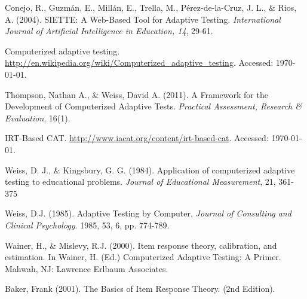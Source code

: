 \begin{thebibliography}{9}

 Conejo, R., Guzmán, E., Millán, E., Trella, M., Pérez-de-la-Cruz, J. L., \& Rios, A. (2004). SIETTE: A Web-Based Tool for Adaptive Testing. \textit{International Journal of Artificial Intelligence in Education, 14}, 29-61.

 Computerized adaptive testing. \url{http://en.wikipedia.org/wiki/Computerized_adaptive_testing}. Accessed: \today.

 Thompson, Nathan A., \& Weiss, David A. (2011). A Framework for the Development of Computerized Adaptive Tests. \textit{Practical Assessment, Research \& Evaluation}, 16(1).

 IRT-Based CAT. \url{http://www.iacat.org/content/irt-based-cat}. Accessed: \today.

 Weiss, D. J., \& Kingsbury, G. G. (1984). Application of computerized adaptive testing to educational problems. \textit{Journal of Educational Measurement}, 21, 361-375

 Weiss, D.J. (1985). Adaptive Testing by Computer, \textit{Journal of Consulting and Clinical Psychology}. 1985, 53, 6, pp. 774-789.

 Wainer, H., \& Mislevy, R.J. (2000). Item response theory, calibration, and estimation. In Wainer, H. (Ed.) Computerized Adaptive Testing: A Primer. Mahwah, NJ: Lawrence Erlbaum Associates.

 Baker, Frank (2001). The Basics of Item Response Theory. (2nd Edition).


\end{thebibliography}
